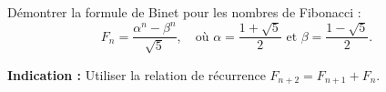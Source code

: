 Démontrer la formule de Binet pour les nombres de Fibonacci :
\[
F_n = \frac{\alpha^n - \beta^n}{\sqrt{5}}, \quad
\text{où } \alpha = \frac{1 + \sqrt{5}}{2} \text{ et } \beta = \frac{1 - \sqrt{5}}{2}.
\]

\textbf{Indication :} Utiliser la relation de récurrence $F_{n+2} = F_{n+1} + F_n$.
